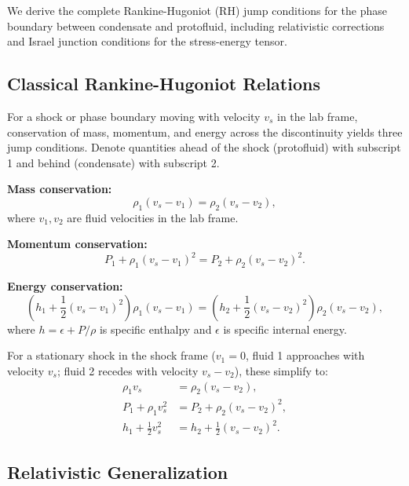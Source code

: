 \documentclass[11pt,a4paper]{article}
\theoremstyle{definition}
\theoremstyle{remark}
\begin{document}
We derive the complete Rankine-Hugoniot (RH) jump conditions for the phase boundary between condensate and protofluid, including relativistic corrections and Israel junction conditions for the stress-energy tensor.

\subsection{Classical Rankine-Hugoniot Relations}
\label{sec:rh_classical}

For a shock or phase boundary moving with velocity $v_s$ in the lab frame, conservation of mass, momentum, and energy across the discontinuity yields three jump conditions. Denote quantities ahead of the shock (protofluid) with subscript 1 and behind (condensate) with subscript 2.

\textbf{Mass conservation:}
\begin{equation}
\label{eq:rh_mass}
\rho_1(v_s - v_1) = \rho_2(v_s - v_2),
\end{equation}
where $v_1, v_2$ are fluid velocities in the lab frame.

\textbf{Momentum conservation:}
\begin{equation}
\label{eq:rh_momentum}
P_1 + \rho_1(v_s - v_1)^2 = P_2 + \rho_2(v_s - v_2)^2.
\end{equation}

\textbf{Energy conservation:}
\begin{equation}
\label{eq:rh_energy}
\left(h_1 + \frac{1}{2}(v_s - v_1)^2\right)\rho_1(v_s - v_1) = \left(h_2 + \frac{1}{2}(v_s - v_2)^2\right)\rho_2(v_s - v_2),
\end{equation}
where $h = \epsilon + P/\rho$ is specific enthalpy and $\epsilon$ is specific internal energy.

For a stationary shock in the shock frame ($v_1 = 0$, fluid 1 approaches with velocity $v_s$; fluid 2 recedes with velocity $v_s - v_2$), these simplify to:
\begin{align}
\rho_1 v_s &= \rho_2(v_s - v_2), \label{eq:rh_mass_shock} \\
P_1 + \rho_1 v_s^2 &= P_2 + \rho_2(v_s - v_2)^2, \label{eq:rh_momentum_shock} \\
h_1 + \frac{1}{2}v_s^2 &= h_2 + \frac{1}{2}(v_s - v_2)^2. \label{eq:rh_energy_shock}
\end{align}

\subsection{Relativistic Generalization}
\label{sec:rh_relativistic}
\end{document}
